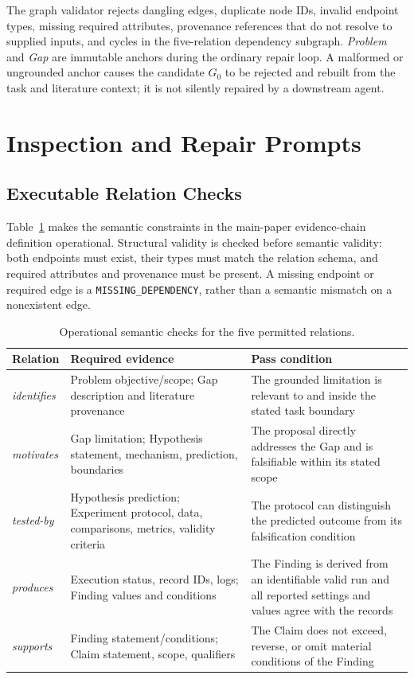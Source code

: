 The graph validator rejects dangling edges, duplicate node IDs, invalid
endpoint types, missing required attributes, provenance references that do not
resolve to supplied inputs, and cycles in the five-relation dependency
subgraph. \textit{Problem} and \textit{Gap} are immutable anchors during the
ordinary repair loop. A malformed or ungrounded anchor causes the candidate
$G_0$ to be rejected and rebuilt from the task and literature context; it is
not silently repaired by a downstream agent.

\section{Inspection and Repair Prompts}
\label{app:repair-prompts}

\subsection{Executable Relation Checks}

Table~\ref{tab:relation-checks} makes the semantic constraints in the
main-paper evidence-chain definition operational. Structural validity is
checked before semantic validity: both endpoints must exist, their types must
match the relation schema, and required attributes and provenance must be
present. A missing endpoint or required edge is a
\texttt{MISSING\_DEPENDENCY}, rather than a semantic mismatch on a nonexistent
edge.

\begin{table}[t]
  \centering
  \small
  \setlength{\tabcolsep}{3pt}
  \begin{tabular}{@{}p{1.35cm}p{2.55cm}p{3.45cm}@{}}
    \toprule
    \textbf{Relation} & \textbf{Required evidence} & \textbf{Pass condition} \\
    \midrule
    \textit{identifies} & Problem objective/scope; Gap description and
    literature provenance & The grounded limitation is relevant to and inside
    the stated task boundary \\
    \textit{motivates} & Gap limitation; Hypothesis statement, mechanism,
    prediction, boundaries & The proposal directly addresses the Gap and is
    falsifiable within its stated scope \\
    \textit{tested-by} & Hypothesis prediction; Experiment protocol, data,
    comparisons, metrics, validity criteria & The protocol can distinguish the
    predicted outcome from its falsification condition \\
    \textit{produces} & Execution status, record IDs, logs; Finding values and
    conditions & The Finding is derived from an identifiable valid run and all
    reported settings and values agree with the records \\
    \textit{supports} & Finding statement/conditions; Claim statement, scope,
    qualifiers & The Claim does not exceed, reverse, or omit material
    conditions of the Finding \\
    \bottomrule
  \end{tabular}
  \caption{Operational semantic checks for the five permitted relations.}
  \label{tab:relation-checks}
\end{table}

